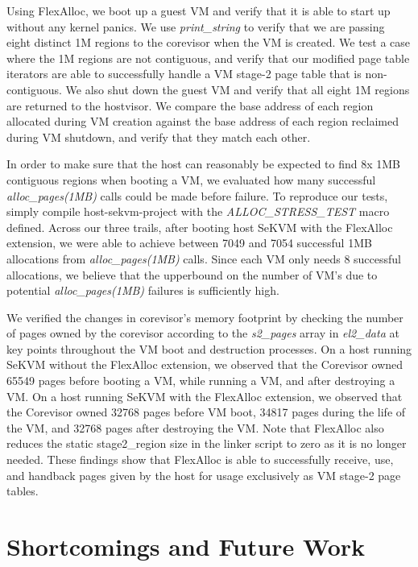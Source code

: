 Using FlexAlloc, we boot up a guest VM and verify that it is able to start up
without any kernel panics. We use \textit{print\_string} to verify that we
are passing eight distinct 1M regions to the corevisor when the VM is created.
We test a case where the 1M regions are not contiguous, and verify that our
modified page table iterators are able to successfully handle a VM stage-2 page
table that is non-contiguous. We also shut down the guest VM and verify that
all eight 1M regions are returned to the hostvisor. We compare the base address
of each region allocated during VM creation against the base address of each
region reclaimed during VM shutdown, and verify that they match each other.

In order to make sure that the host can reasonably be expected to find 8x 1MB
contiguous regions when booting a VM, we evaluated how many successful
\textit{alloc\_pages(1MB)} calls could be made before failure. To reproduce our tests,
simply compile host-sekvm-project with the \textit{ALLOC\_STRESS\_TEST} macro defined.
Across our three trails, after booting host SeKVM with the FlexAlloc extension,
we were able to achieve between 7049 and 7054 successful 1MB allocations
from \textit{alloc\_pages(1MB)} calls. Since each VM only needs 8 successful allocations,
we believe that the upperbound on the number of VM's due to potential \textit{alloc\_pages(1MB)}
failures is sufficiently high.

We verified the changes in corevisor's memory footprint by checking the number of
pages owned by the corevisor according to the \textit{s2\_pages} array in \textit{el2\_data} at key points
throughout the VM boot and destruction processes. On a host running SeKVM without the
FlexAlloc extension, we observed that the Corevisor owned 65549 pages before booting a VM,
while running a VM, and after destroying a VM. On a host running SeKVM with the FlexAlloc
extension, we observed that the Corevisor owned 32768 pages before VM boot, 34817 pages
during the life of the VM, and 32768 pages after destroying the VM. Note that FlexAlloc also
reduces the static stage2\_region size in the linker script to zero as it is no longer needed.
These findings show that FlexAlloc is able to successfully receive, use, and handback pages
given by the host for usage exclusively as VM stage-2 page tables.

\section{Shortcomings and Future Work}

